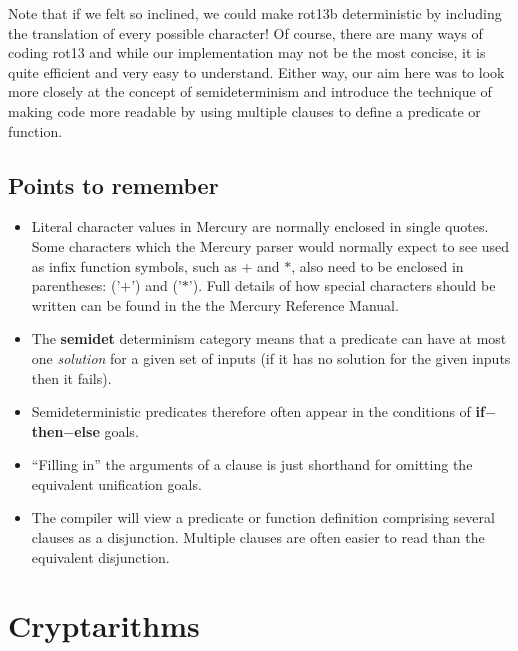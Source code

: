 \documentclass[a4paper,11pt,notitlepage,onecolumn]{book}
\begin{document}
Note that if we felt so inclined, we could make \textsf{rot13b} deterministic by
including the translation of every possible character!  Of course, there are
many ways of coding \textsf{rot13} and while our implementation may not be the most
concise, it is quite efficient and very easy to understand.  Either way, our
aim here was to look more closely at the concept of semideterminism and
introduce the technique of making code more readable by using multiple
clauses to define a predicate or function.

\subsection*{Points to remember}

\begin{itemize}
\item Literal character values in Mercury are normally enclosed in single
quotes.  Some characters which the Mercury parser would normally expect to
see used as infix function symbols, such as \textsf{{\ensuremath{+}}} and \textsf{{\ensuremath{*}}}, also need to be
enclosed in parentheses: \textsf{('{\ensuremath{+}}')} and \textsf{('{\ensuremath{*}}')}.  Full details of how special
characters should be written can be found in the the Mercury Reference
Manual.
\item The \textsf{\textbf{semidet}} determinism category means that a predicate can have
at most one \emph{solution} for a given set of inputs (if it has no solution
for the given inputs then it fails).
\item Semideterministic predicates therefore often appear in the conditions
of \textsf{\textbf{if}{\ensuremath{-}}\textbf{then}{\ensuremath{-}}\textbf{else}} goals.
\item ``Filling in'' the arguments of a clause is just shorthand for
omitting the equivalent unification goals.
\item The compiler will view a predicate or function definition comprising
several clauses as a disjunction.  Multiple clauses are often easier to read
than the equivalent disjunction.
\end{itemize}





\newpage




\section{Cryptarithms}
\end{document}
